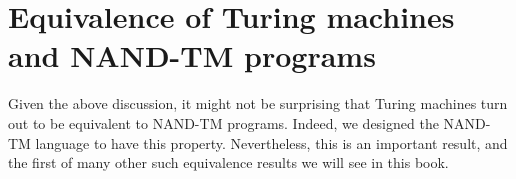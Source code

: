 \section{Equivalence of Turing machines and NAND-TM
programs}\label{Equivalence-of-Turing-mac}

Given the above discussion, it might not be surprising that Turing
machines turn out to be equivalent to NAND-TM programs. Indeed, we
designed the NAND-TM language to have this property. Nevertheless, this
is an important result, and the first of many other such equivalence
results we will see in this book.

\hypertarget{TM-equiv-thm}{}

